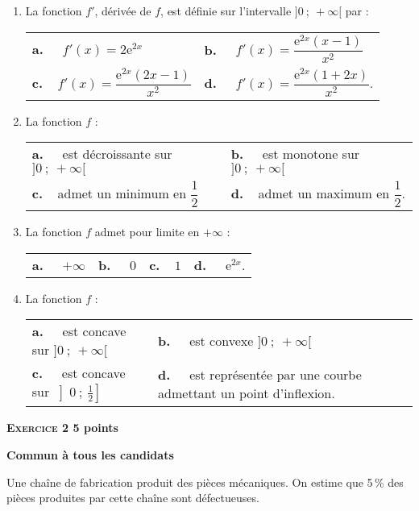 \documentclass[11pt,a4paper,french]{article}
\newcommand{\e}{\text{e}}
\begin{document}
\begin{enumerate}
\item La fonction $f'$, dérivée de $f$, est définie sur l'intervalle $]0~;~+\infty[$ par :

\begin{tabularx}{\linewidth}{*{2}{X}}
\textbf{a.~~} $f'(x) = 2\e^{2x}$ 					&\textbf{b.~~} $f'(x)=\dfrac{\e^{2x}(x-1)}{x^2} $\\[0.35cm]
\textbf{c.~~}$ f'(x) = \dfrac{\e^{2x}(2x - 1)}{x^2}$& \textbf{d.~~} $f'(x)=\dfrac{\e^{2x}(1 + 2x)}{x^2} $.\\
\end{tabularx}

\item La fonction $f$ :

\begin{tabularx}{\linewidth}{*{2}{X}}
\textbf{a.~~} est décroissante sur $]0~;~+\infty[ $ &\textbf{b.~~} est monotone sur $]0~;~+\infty[$\\
\textbf{c.~~}admet un minimum en $\dfrac{1}{2}$		& \textbf{d.~~}admet un maximum en $\dfrac{1}{2}$.
\end{tabularx}
\item  La fonction $f$ admet pour limite en $+ \infty$ :

\begin{tabularx}{\linewidth}{*{4}{X}}
\textbf{a.~~} $+\infty $ &\textbf{b.~~} $0$&\textbf{c.~~}$1$& \textbf{d.~~} $\e^{2x}$.
\end{tabularx}
\item  La fonction $f$ :

\begin{tabularx}{\linewidth}{*{4}{X}}
\textbf{a.~~} est concave sur $]0~;~+\infty[$ &\textbf{b.~~} est convexe  $]0~;~+\infty[$\\
\textbf{c.~~} est concave sur $\left]0~;~\frac{1}{2}\right] $& \textbf{d.~~} est représentée par une courbe
admettant un point d'inflexion.\\
\end{tabularx}
 
\end{enumerate}

\vspace{0,5cm}

\textbf{\textsc{Exercice 2} \hfill 5 points}

\textbf{Commun à tous les candidats}
\medskip

Une chaîne de fabrication produit des pièces mécaniques. On estime que 5\,\% des pièces
produites par cette chaîne sont défectueuses.
\end{document}
